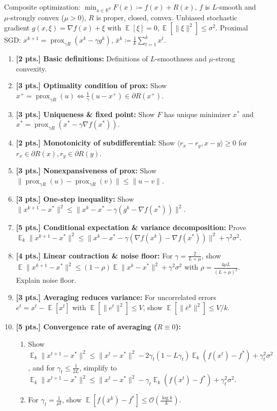 \documentclass[11pt,a4paper]{article}
\DeclareMathOperator{\E}{\mathbb{E}}
\DeclareMathOperator{\prox}{prox}
\begin{document}
Composite optimization: $\min_{x \in \mathbb{R}^d} F(x) \coloneqq f(x) + R(x)$, $f$ is $L$-smooth and $\mu$-strongly convex ($\mu > 0$), $R$ is proper, closed, convex. Unbiased stochastic gradient $g(x, \xi) = \nabla f(x) + \xi$ with $\E[\xi] = 0, \E[\|\xi\|^2] \le \sigma^2$. Proximal SGD: $x^{k+1} = \prox_{\gamma R}(x^k - \gamma g^k)$, $\bar{x}^k \coloneqq \frac{1}{k} \sum_{t=1}^k x^t$.

\begin{enumerate}[label=\textbf{(\arabic*)}]
    \item \textbf{[2 pts.] Basic definitions:} Definitions of $L$-smoothness and $\mu$-strong convexity.
    \item \textbf{[3 pts.] Optimality condition of prox:} Show $x^+ = \prox_{\gamma R}(u) \iff \frac{1}{\gamma}(u - x^+) \in \partial R(x^+)$.
    \item \textbf{[3 pts.] Uniqueness \& fixed point:} Show $F$ has unique minimizer $x^*$ and $x^* = \prox_{\gamma R}(x^* - \gamma \nabla f(x^*))$.
    \item \textbf{[2 pts.] Monotonicity of subdifferential:} Show $\langle r_x - r_y, x - y \rangle \ge 0$ for $r_x \in \partial R(x), r_y \in \partial R(y)$.
    \item \textbf{[3 pts.] Nonexpansiveness of prox:} Show $\|\prox_{\gamma R}(u) - \prox_{\gamma R}(v)\| \le \|u - v\|$.
    \item \textbf{[3 pts.] One-step inequality:} Show $\|x^{k+1} - x^*\|^2 \le \|x^k - x^* - \gamma (g^k - \nabla f(x^*))\|^2$.
    \item \textbf{[5 pts.] Conditional expectation \& variance decomposition:} Prove $\E_k \|x^{k+1} - x^*\|^2 \le \|x^k - x^* - \gamma(\nabla f(x^k) - \nabla f(x^*))\|^2 + \gamma^2 \sigma^2$.
    \item \textbf{[4 pts.] Linear contraction \& noise floor:} For $\gamma = \frac{2}{L + \mu}$, show $\E \|x^{k+1} - x^*\|^2 \le (1 - \rho)\E \|x^k - x^*\|^2 + \gamma^2 \sigma^2$ with $\rho = \frac{4\mu L}{(L+\mu)^2}$. Explain noise floor.
    \item \textbf{[3 pts.] Averaging reduces variance:} For uncorrelated errors $e^t = x^t - \E[x^t]$ with $\E[\|e^t\|^2] \le V$, show $\E[\|\bar{e}^k\|^2] \le V/k$.
    \item \textbf{[5 pts.] Convergence rate of averaging ($R \equiv 0$):}
    \begin{enumerate}[label=(\a*)]
        \item Show $\E_k \|x^{t+1} - x^*\|^2 \le \|x^t - x^*\|^2 - 2\gamma_t (1 - L\gamma_t) \E_k(f(x^t) - f^*) + \gamma_t^2 \sigma^2$, and for $\gamma_t \le \frac{1}{2L}$, simplify to $\E_k \|x^{t+1} - x^*\|^2 \le \|x^t - x^*\|^2 - \gamma_t \E_k(f(x^t) - f^*) + \gamma_t^2 \sigma^2$.
        \item For $\gamma_t = \frac{1}{\mu t}$, show $\E[f(\bar{x}^k) - f^*] \le \mathcal{O}\left( \frac{\log k}{k} \right)$.
    \end{enumerate}
\end{enumerate}
\end{document}
